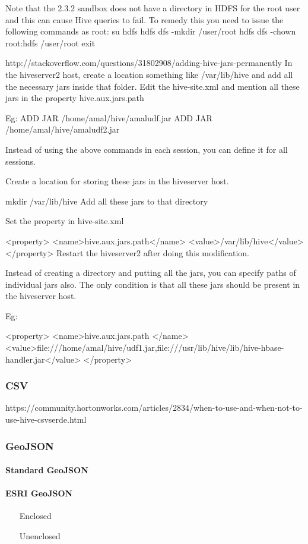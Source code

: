\documentclass[a4paper,12pt,oneside]{report}
\begin{document}
	
	Note that the 2.3.2 sandbox does not have a directory in HDFS for the root user and this can cause Hive queries to fail. To remedy this you need to issue the following commands as root:
su hdfs
hdfs dfs -mkdir /user/root
hdfs dfs -chown root:hdfs /user/root
exit
	



http://stackoverflow.com/questions/31802908/adding-hive-jars-permanently
In the hiveserver2 host, create a location something like /var/lib/hive and add all the necessary jars inside that folder. Edit the hive-site.xml and mention all these jars in the property hive.aux.jars.path

Eg: ADD JAR /home/amal/hive/amaludf.jar ADD JAR /home/amal/hive/amaludf2.jar

Instead of using the above commands in each session, you can define it for all sessions.

Create a location for storing these jars in the hiveserver host.

mkdir /var/lib/hive
Add all these jars to that directory

Set the property in hive-site.xml

<property>
  <name>hive.aux.jars.path</name>
  <value>/var/lib/hive</value>
</property>
Restart the hiveserver2 after doing this modification.

Instead of creating a directory and putting all the jars, you can specify paths of individual jars also. The only condition is that all these jars should be present in the hiveserver host.

Eg:

<property>
  <name>hive.aux.jars.path </name>
  <value>file:///home/amal/hive/udf1.jar,file:///usr/lib/hive/lib/hive-hbase-handler.jar</value>
</property>
	
		\subsubsection{CSV}
		
		https://community.hortonworks.com/articles/2834/when-to-use-and-when-not-to-use-hive-csvserde.html
		\subsubsection{GeoJSON}\label{json}	
			\paragraph{Standard GeoJSON}	
			\paragraph{ESRI GeoJSON}
				\begin{enumerate}
					\item[Enclosed]
					\item[Unenclosed]
				\end{enumerate}
	
\end{document}

